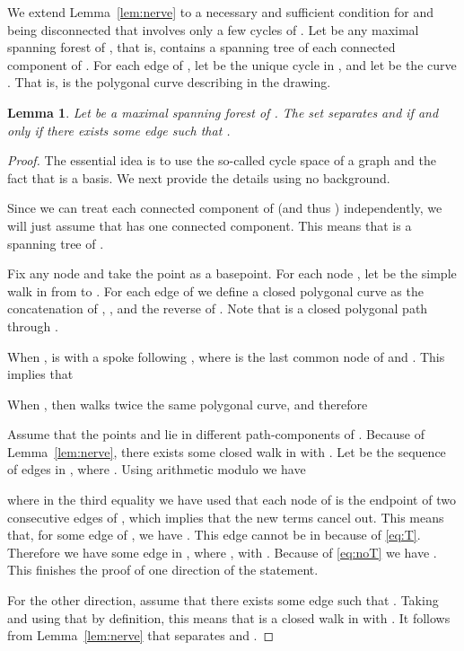 \documentclass[a4paper,11pt]{article}
\newtheorem{lemma}[theorem]{Lemma}
\begin{document}
We extend Lemma~\ref{lem:nerve} 
to a necessary and sufficient condition for  and  being disconnected
that involves only a few cycles of . 
Let  be any maximal spanning forest of , that is,  contains a spanning
tree of each connected component of . 
For each edge  of , let  be the unique cycle
in , and let  be the curve .
That is,  is the polygonal curve describing  in the drawing.

\begin{lemma}
\label{lem:homology_condition}
	Let  be a maximal spanning forest of .
	The set  separates  and  if and only if
	there exists some edge  such that .
\end{lemma}
\begin{proof}
	The essential idea is to use the so-called cycle space of a graph and the fact that
	 is a basis. We next provide the details
	using no background.
	
	Since we can treat each connected component of  (and thus ) independently,
	we will just assume that  has one connected component. This means that  is a spanning
	tree of .
	
	Fix any node  and take the point  as a basepoint. 
	For each node , let  be the simple walk in  from  to .
	For each edge  of  we define a closed polygonal curve  
	as the concatenation of , , and the reverse of .
	Note that  is a closed polygonal path through .
	
	When ,  is  with a spoke following ,
	where  is the last common node of  and .
	This implies that 
	
	When , then  walks twice the same polygonal curve,
	and therefore 
	
	
	Assume that the points  and  lie in different path-components of .
	Because of Lemma~\ref{lem:nerve}, there exists some closed walk  in  
	with .
	Let  be the sequence of edges in , where . 
	Using arithmetic modulo  we have  
	
	where in the third equality we have used that each node of  
	is the endpoint of two consecutive edges of , which implies that the new terms
	cancel out.
	This means that, for some edge  of , we have
	. This edge  cannot be in 
	because of \eqref{eq:T}.
	Therefore we have some edge  in , where ,
	with . Because of \eqref{eq:noT} we have
	.
	This finishes the proof of one direction of the statement.
	
	For the other direction, assume that there exists some edge 
	such that . Taking  and using
	that  by definition,
	this means that  is a closed walk in  with .
	It follows from Lemma~\ref{lem:nerve} that  separates  and .	
\end{proof}
\end{document}
